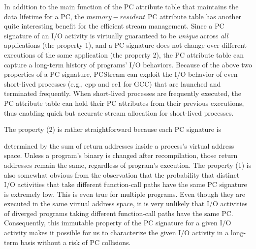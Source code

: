 {\color{blue}
In addition to the main function of the PC attribute table that maintains 
the data lifetime for a PC, the $memory-resident$ PC attribute table has 
another quite interesting benefit for the efficient
stream management.  Since a PC signature of an I/O activity is virtually 
guaranteed to be {\it unique} across {\it all} applications (the property 1),  
and a PC signature does not change over different executions of the same 
application (the property 2), the PC attribute table can capture a long-term 
history of programs' I/O behaviors.  
Because of the above two properties of a PC signature, \textsf{\small PCStream} can 
exploit the I/O behavior of even short-lived processes 
(e.g., cpp and cc1 for GCC)  that are launched and terminated frequently.  
When short-lived processes are frequently executed, the PC attribute table 
can hold their PC attributes from their previous executions, 
thus enabling quick but accurate stream allocation for short-lived
processes.

The property (2) is rather straightforward because each PC signature is 
}
determined by the sum of return addresses inside a process's
virtual address space.  Unless a program's binary is changed after
recompilation, those return addresses remain the same, regardless of program's
execution.  
{\color{blue}
The property (1) is also somewhat obvious from the observation
}
that the probability that distinct I/O activities that take
different function-call paths have the same PC signature is extremely low. This
is even true for multiple programs. Even though they are executed in the same
virtual address space, it is very unlikely that I/O activities of diverged
programs taking different function-call paths have the same PC.  
Consequently, this immutable property of
the PC signature for a given I/O activity makes it possible for us to characterize 
{\color{blue}
the given I/O activity in a long-term basis without a risk of PC collisions.
}


